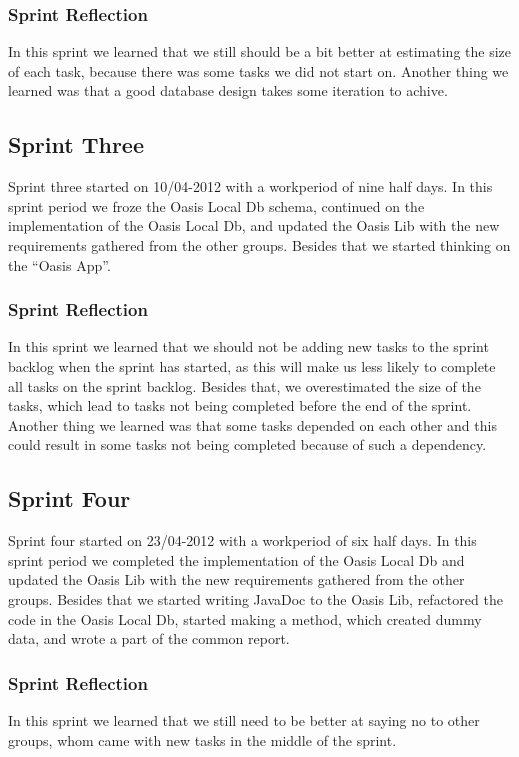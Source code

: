 \subsubsection{Sprint Reflection}
In this sprint we learned that we still should be a bit better at estimating the size of each task, because there was some tasks we did not start on.
Another thing we learned was that a good database design takes some iteration to achive.

\subsection{Sprint Three}
Sprint three started on 10/04-2012 with a workperiod of nine half days. In this sprint period we froze the Oasis Local Db schema, continued on the implementation of the Oasis Local Db, and updated the Oasis Lib with the new requirements gathered from the other groups. 
Besides that we started thinking on the ``Oasis App''.

\subsubsection{Sprint Reflection}
In this sprint we learned that we should not be adding new tasks to the sprint backlog when the sprint has started, as this will make us less likely to complete all tasks on the sprint backlog.
Besides that, we overestimated the size of the tasks, which lead to tasks not being completed before the end of the sprint.
Another thing we learned was that some tasks depended on each other and this could result in some tasks not being completed because of such a dependency.

\subsection{Sprint Four}
Sprint four started on 23/04-2012 with a workperiod of six half days. In this sprint period we completed the implementation of the Oasis Local Db and updated the Oasis Lib with the new requirements gathered from the other groups. Besides that we started writing JavaDoc to the Oasis Lib, refactored the code in the Oasis Local Db, started making a method, which created dummy data, and wrote a part of the common report.

\subsubsection{Sprint Reflection}
In this sprint we learned that we still need to be better at saying no to other groups, whom came with new tasks in the middle of the sprint.

